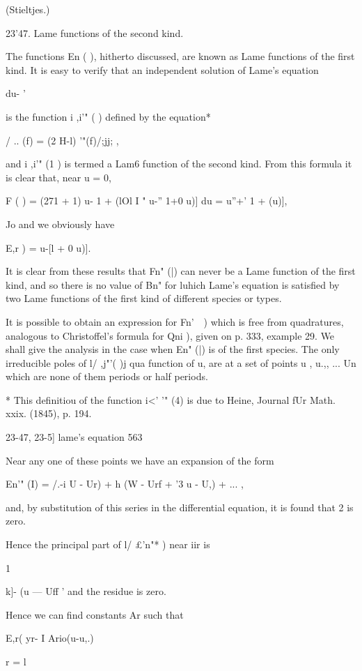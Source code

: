 {{{{{{{(Stieltjes.)

23'47. Lame functions of the second kind.

The functions En ( ), hitherto discussed, are known as Lame functions
of the first kind. It is easy to verify that an independent solution
of Lame's equation

du- '

is the function i ,i'" ( ) defined by the equation*

/ .. (f) = (2 H-l) '"(f)/;jj; ,

and i ,i'" (1 ) is termed a Lam6 function of the second kind. From
this formula it is clear that, near u = 0,

F ( ) = (271 + 1) u- 1 + (lOl I " u-'' 1+0 u)] du = u''+' 1 + (u)],

Jo and we obviously have

E,r ) = u-[l + 0 u)].

It is clear from these results that Fn" (|) can never be a Lame
function of the first kind, and so there is no value of Bn" for luhich
Lame's equation is satisfied by two Lame functions of the first kind
of different species or types.

It is possible to obtain an expression for Fn'\ \ ) which is free from
quadratures, analogous to Christoffel's formula for Qni ), given on p.
333, example 29. We shall give the analysis in the case when En" (|)
is of the first species. The only irreducible poles of l/ ,j"'( )j qua
function of u, are at a set of points u , u.,, ... Un which are none
of them periods or half periods.

* This definitiou of the function i<' '" (4) is due to Heine, Journal
fUr Math. xxix. (1845), p. 194.



23-47, 23-5] lame's equation 563

Near any one of these points we have an expansion of the form

En'" (I) = /.-i U - Ur) + h (W - Urf + '3 u - U,) + ... ,

and, by substitution of this series in the differential equation, it
is found that 2 is zero.

Hence the principal part of l/ £'n"* ) near iir is

1

k]- (u — Uff ' and the residue is zero.

Hence we can find constants Ar such that

 E,r( yr- I Ario(u-u,.)

r = l

}}}}}}}

